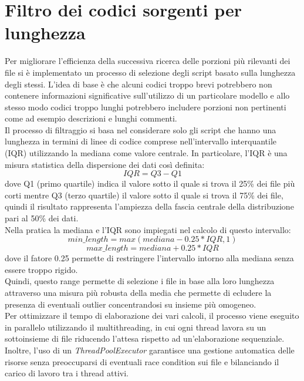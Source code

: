 \documentclass{article}
\begin{document}
\section{Filtro dei codici sorgenti per lunghezza}
Per migliorare l'efficienza della successiva ricerca delle porzioni più rilevanti dei file si è implementato un processo di selezione degli script basato sulla lunghezza degli stessi. L'idea di base è che alcuni codici troppo brevi potrebbero non contenere informazioni significative sull'utilizzo di un particolare modello e allo stesso modo codici troppo lunghi potrebbero includere porzioni non pertinenti come ad esempio descrizioni e lunghi commenti.\\
Il processo di filtraggio si basa nel considerare solo gli script che hanno una lunghezza in termini di linee di codice comprese nell'intervallo interquantile (IQR) utilizzando la mediana come valore centrale. In particolare, l'IQR è una misura statistica della dispersione dei dati così definita:
\[
IQR = Q3 - Q1
\]
dove Q1 (primo quartile) indica il valore sotto il quale si trova il 25\% dei file più corti mentre Q3 (terzo quartile) il valore sotto il quale si trova il 75\% dei file, quindi il risultato rappresenta l'ampiezza della fascia centrale della distribuzione pari al 50\% dei dati.\\
Nella pratica la mediana e l'IQR sono impiegati nel calcolo di questo intervallo:
\[
min\_length =max(mediana-0.25*IQR,1)
\]
\[
max\_length =mediana+0.25*IQR
\]
dove il fatore 0.25 permette di restringere l'intervallo intorno alla mediana senza essere troppo rigido.\\
Quindi, questo range permette di selezione i file in base alla loro lunghezza attraverso una misura più robusta della media che permette di ecludere la presenza di eventuali outlier concentrandosi su insieme più omogeneo.\\
Per ottimizzare il tempo di elaborazione dei vari calcoli, il processo viene eseguito in parallelo utilizzando il multithreading, in cui ogni thread lavora su un sottoinsieme di file riducendo l'attesa rispetto ad un'elaborazione sequenziale. Inoltre, l'uso di un \textit{ThreadPoolExecutor} garantisce una gestione automatica delle risorse senza preoccuparsi di eventuali race condition sui file e bilanciando il carico di lavoro tra i thread attivi.
\end{document}

